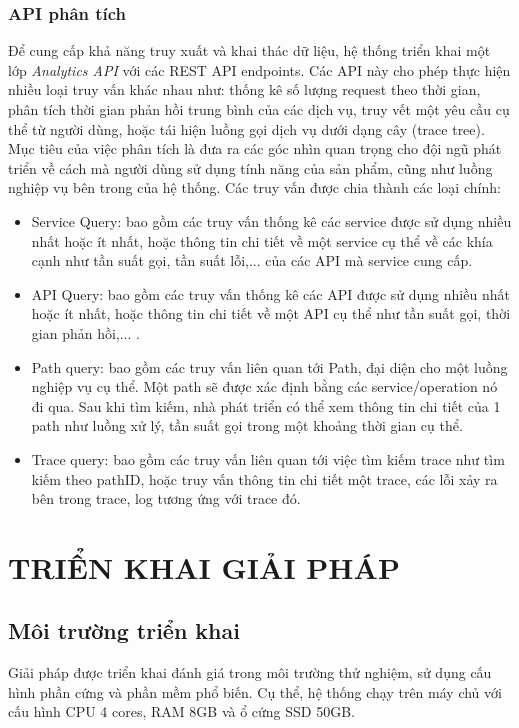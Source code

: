 \documentclass{uetgraduation}
\begin{document}
\subsection{API phân tích}

Để cung cấp khả năng truy xuất và khai thác dữ liệu, hệ thống triển khai một lớp \textit{Analytics API} với các REST API endpoints. Các API này cho phép thực hiện nhiều loại truy vấn khác nhau như: thống kê số lượng request theo thời gian, phân tích thời gian phản hồi trung bình của các dịch vụ, truy vết một yêu cầu cụ thể từ người dùng, hoặc tái hiện luồng gọi dịch vụ dưới dạng cây (trace tree). Mục tiêu của việc phân tích là đưa ra các góc nhìn quan trọng cho đội ngũ phát triển về cách mà người dùng sử dụng tính năng của sản 
phẩm, cũng như luồng nghiệp vụ bên trong của hệ thống. Các truy vấn được chia thành các loại chính:
\begin{itemize}
    \item Service Query: bao gồm các truy vấn thống kê các service được sử dụng nhiều nhất hoặc ít nhất, hoặc thông tin chi tiết về một service cụ thể về các khía cạnh như tần suất gọi, tần suất lỗi,... của các API mà service cung cấp.
    \item API Query: bao gồm các truy vấn thống kê các API được sử dụng nhiều nhất hoặc ít nhất, hoặc thông tin chi tiết về một API cụ thể như tần suất gọi, thời gian phản hồi,... .
    \item Path query: bao gồm các truy vấn liên quan tới Path, đại diện cho một luồng nghiệp vụ cụ thể. Một path sẽ được xác định bằng các service/operation nó đi qua. Sau khi tìm kiếm, nhà phát triển có thể xem thông tin chi tiết của 1 path như luồng xử lý, tần suất gọi trong một khoảng thời gian cụ thể.
    \item Trace query: bao gồm các truy vấn liên quan tới việc tìm kiếm trace như tìm kiếm theo pathID, hoặc truy vấn thông tin chi tiết một trace, các lỗi xảy ra bên trong trace, log tương ứng với trace đó.
\end{itemize}

\chapter{TRIỂN KHAI GIẢI PHÁP}

\section{Môi trường triển khai}

Giải pháp được triển khai đánh giá trong môi trường thử nghiệm, sử dụng cấu hình phần cứng và phần mềm phổ biến. Cụ thể, hệ thống chạy trên máy chủ với cấu hình CPU 4 cores, RAM 8GB và ổ cứng SSD 50GB.
\end{document}
